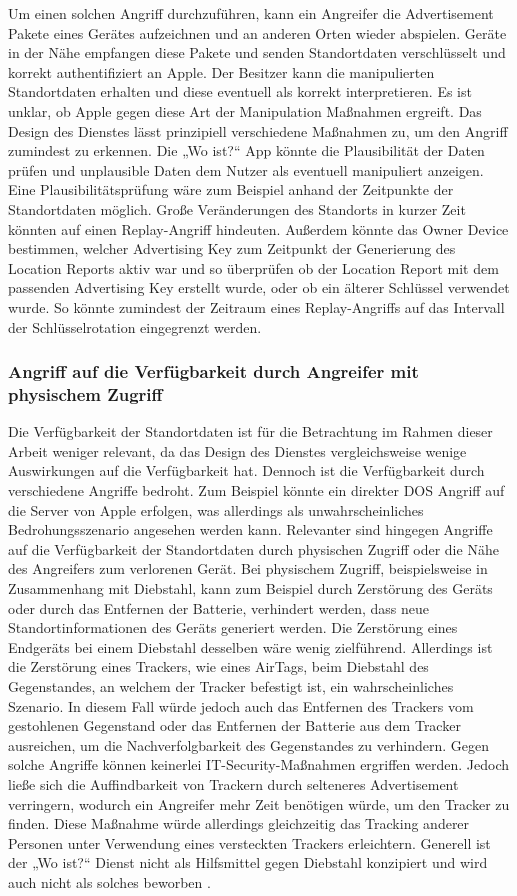 Um einen solchen Angriff durchzuführen, kann ein Angreifer die Advertisement Pakete eines Gerätes aufzeichnen und an anderen Orten wieder abspielen.
Geräte in der Nähe empfangen diese Pakete und senden Standortdaten verschlüsselt und korrekt authentifiziert an Apple.
Der Besitzer kann die manipulierten Standortdaten erhalten und diese eventuell als korrekt interpretieren.
Es ist unklar, ob Apple gegen diese Art der Manipulation Maßnahmen ergreift.
Das Design des Dienstes lässt prinzipiell verschiedene Maßnahmen zu, um den Angriff zumindest zu erkennen.
Die „Wo ist?“ App könnte die Plausibilität der Daten prüfen und unplausible Daten dem Nutzer als eventuell manipuliert anzeigen.
Eine Plausibilitätsprüfung wäre zum Beispiel anhand der Zeitpunkte der Standortdaten möglich.
Große Veränderungen des Standorts in kurzer Zeit könnten auf einen Replay-Angriff hindeuten.
Außerdem könnte das Owner Device bestimmen, welcher Advertising Key zum Zeitpunkt der Generierung des Location Reports aktiv war und so überprüfen ob der Location Report mit dem passenden Advertising Key erstellt wurde, oder ob ein älterer Schlüssel verwendet wurde.
So könnte zumindest der Zeitraum eines Replay-Angriffs auf das Intervall der Schlüsselrotation eingegrenzt werden.

\subsubsection{Angriff auf die Verfügbarkeit durch Angreifer mit physischem Zugriff}
Die Verfügbarkeit der Standortdaten ist für die Betrachtung im Rahmen dieser Arbeit weniger relevant, da das Design des Dienstes vergleichsweise wenige Auswirkungen auf die Verfügbarkeit hat.
Dennoch ist die Verfügbarkeit durch verschiedene Angriffe bedroht.
Zum Beispiel könnte ein direkter \ac{DOS} Angriff auf die Server von Apple erfolgen, was allerdings als unwahrscheinliches Bedrohungsszenario angesehen werden kann.
Relevanter sind hingegen Angriffe auf die Verfügbarkeit der Standortdaten durch physischen Zugriff oder die Nähe des Angreifers zum verlorenen Gerät.
Bei physischem Zugriff, beispielsweise in Zusammenhang mit Diebstahl, kann zum Beispiel durch Zerstörung des Geräts oder durch das Entfernen der Batterie, verhindert werden, dass neue Standortinformationen des Geräts generiert werden.
Die Zerstörung eines Endgeräts bei einem Diebstahl desselben wäre wenig zielführend.
Allerdings ist die Zerstörung eines Trackers, wie eines AirTags, beim Diebstahl des Gegenstandes, an welchem der Tracker befestigt ist, ein wahrscheinliches Szenario.
In diesem Fall würde jedoch auch das Entfernen des Trackers vom gestohlenen Gegenstand oder das Entfernen der Batterie aus dem Tracker ausreichen, um die Nachverfolgbarkeit des Gegenstandes zu verhindern.
Gegen solche Angriffe können keinerlei IT-Security-Maßnahmen ergriffen werden.
Jedoch ließe sich die Auffindbarkeit von Trackern durch selteneres Advertisement verringern, wodurch ein Angreifer mehr Zeit benötigen würde, um den Tracker zu finden.
Diese Maßnahme würde allerdings gleichzeitig das Tracking anderer Personen unter Verwendung eines versteckten Trackers erleichtern.
Generell ist der „Wo ist?“ Dienst nicht als Hilfsmittel gegen Diebstahl konzipiert und wird auch nicht als solches beworben \cite{Apple_WoIst}.

